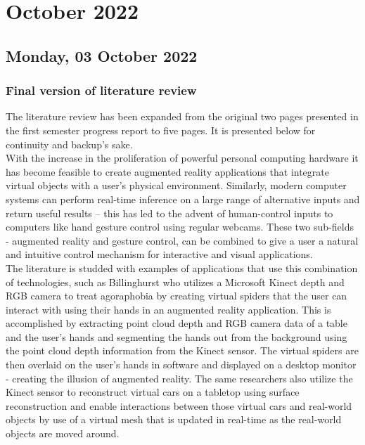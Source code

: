 \chapter[2022 October]{October 2022}

\section[2022/10/03]{Monday, 03 October 2022}

\subsection{Final version of literature review}

The literature review has been expanded from the original two pages presented in the first semester progress report to five pages. It is presented below for continuity and backup's sake. \\

With the increase in the proliferation of powerful personal computing hardware it has become feasible to create augmented reality applications that integrate virtual objects with a user’s physical environment. Similarly, modern computer systems can perform real-time inference on a large range of alternative inputs and return useful results – this has led to the advent of human-control inputs to computers like hand gesture control using regular webcams. These two sub-fields - augmented reality and gesture control, can be combined to give a user a natural and intuitive control mechanism for interactive and visual applications. \\

The literature is studded with examples of applications that use this combination of technologies, such as Billinghurst \cite{Australia_spiders} who utilizes a Microsoft Kinect depth and RGB camera to treat agoraphobia by creating virtual spiders that the user can interact with using their hands in an augmented reality application. This is accomplished by extracting point cloud depth and RGB camera data of a table and the user's hands and segmenting the hands out from the background using the point cloud depth information from the Kinect sensor. The virtual spiders are then overlaid on the user's hands in software and displayed on a desktop monitor - creating the illusion of augmented reality. The same researchers also utilize the Kinect sensor to reconstruct virtual cars on a tabletop using surface reconstruction and enable interactions between those virtual cars and real-world objects by use of a virtual mesh that is updated in real-time as the real-world objects are moved around.\\

